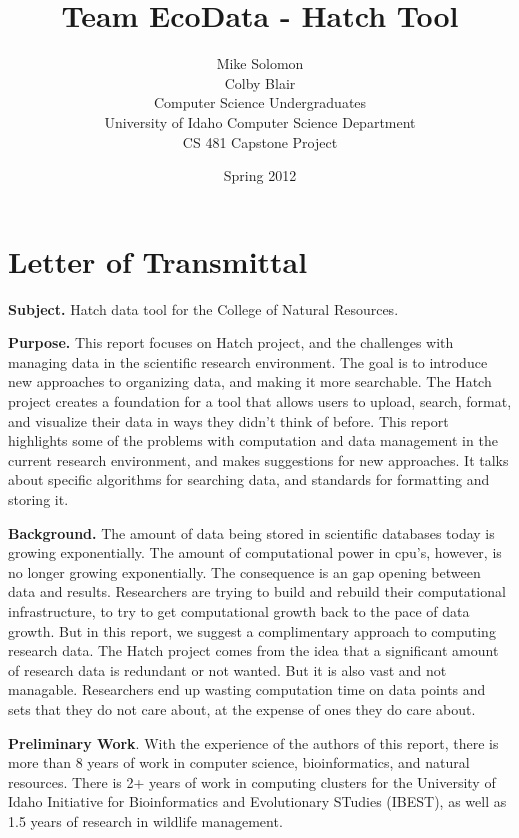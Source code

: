 \documentclass[11pt,letterpaper]{article}
\date{Spring 2012}
\title{Team EcoData - Hatch Tool\\
}
\author{Mike Solomon\\
	Colby Blair \\
	Computer Science Undergraduates \\
	University of Idaho Computer Science Department\\
	CS 481 Capstone Project \\
}
\begin{document}
\section*{Letter of Transmittal}
\textbf{Subject.} Hatch data tool for the College of Natural Resources.

\textbf{Purpose.} This report focuses on Hatch project, and the challenges with managing data in the
scientific research environment. The goal is to introduce new approaches to organizing data, and making
it more searchable. The Hatch project creates a foundation for a tool that allows users to upload, search,
format, and visualize their data in ways they didn't think of before. This report highlights some of the 
problems with computation and data management in the current research environment, and makes 
suggestions for new approaches. It talks about specific algorithms for searching data, and standards for
formatting and storing it.

\textbf{Background.} The amount of data being stored in scientific databases today is growing 
exponentially. The amount of computational power in cpu's, however, is no longer growing exponentially.
The consequence is an gap opening between data and results. Researchers are trying to build and rebuild
their computational infrastructure, to try to get computational growth back to the pace of data growth.
But in this report, we suggest a complimentary approach to computing research data. The Hatch project
comes from the idea that a significant amount of research data is redundant or not wanted. But it is also
vast and not managable. Researchers end up wasting computation time on data points and sets that they do 
not care about, at the expense of ones they do care about.

\textbf{Preliminary Work}. With the experience of the authors of this report, there is more than 8 years of work in computer science, bioinformatics, and natural resources. There is 2+ years of work in computing
clusters for the University of Idaho Initiative for Bioinformatics and Evolutionary STudies (IBEST), as well as 
1.5 years of research in wildlife management. 

\thispagestyle{empty}

\pagebreak

\maketitle

\thispagestyle{empty}
\end{document}
